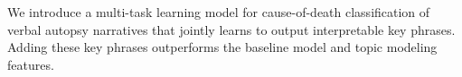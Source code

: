 We introduce a multi-task learning model for cause-of-death classification of verbal autopsy narratives that jointly learns to output interpretable key phrases. Adding these key phrases outperforms the baseline model and topic modeling features.
